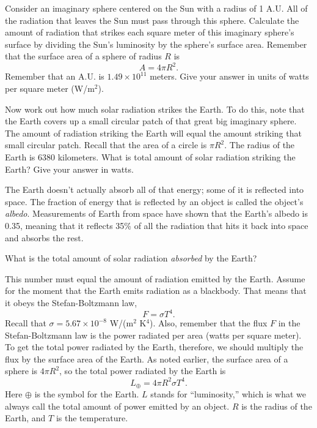 Consider an imaginary sphere centered on the Sun with a radius
of 1 A.U.  All of the radiation that leaves the Sun must pass through
this sphere.  Calculate the amount of radiation that strikes each square
meter of this imaginary sphere's surface by dividing the Sun's luminosity
by the sphere's surface area.  Remember that the surface area of a sphere
of radius $R$ is
$$
A=4\pi R^2.
$$
Remember that an A.U. is $1.49\times 10^{11}$ meters.
Give your answer in units of watts per square meter (W/m$^2$).

\answerspace{1in}

\pagebreak[4]
Now work out how much solar radiation strikes the Earth.  To do this,
note that the Earth covers up a small circular patch of that great big
imaginary sphere.  The amount of radiation striking the Earth will equal
the amount striking that small circular patch.  Recall that the area
of a circle is $\pi R^2$.  The radius of the Earth is 6380 kilometers.
What is total amount of solar radiation
striking the Earth?  Give your answer in watts.

\answerspace{1.5in}

The Earth doesn't actually absorb all of that energy; some of it
is reflected into space.  The fraction of energy that is reflected
by an object is called the object's {\it albedo}.  Measurements of Earth
from space have shown that the Earth's albedo is 0.35, meaning that it
reflects 35\% of all the radiation that hits it back into space and absorbs
the rest.  

What is the total amount of solar radiation {\it absorbed} by the Earth?

\answerspace{1in}

This number must equal the amount of radiation emitted by the Earth.
Assume for the moment that the Earth emits radiation as a blackbody.
That means that it obeys the Stefan-Boltzmann law,
$$
F=\sigma T^4.
$$
Recall that $\sigma=5.67\times 10^{-8}$ W/(m$^2$ K$^4$).
Also, remember that the flux $F$ in the Stefan-Boltzmann law
is the power radiated per area (watts per square meter).  To get
the total power radiated by the Earth, therefore, we should
multiply the flux by the surface area of the Earth.  As noted
earlier, the surface
area of a sphere is $4\pi R^2$, so the total
power radiated by the Earth
is
$$
L_{\oplus}=4\pi R^2\sigma T^4.
$$
Here $\oplus$ is the symbol for the Earth.  $L$ stands
for ``luminosity,'' which is what we always call the total
amount of power emitted by an object.  $R$ is the radius
of the Earth, and $T$ is the temperature.

